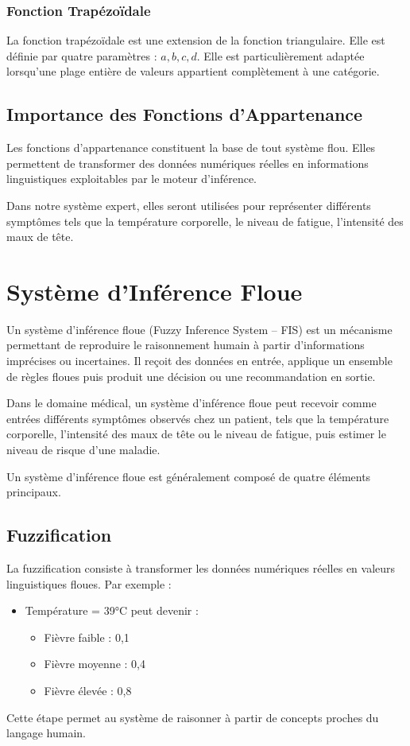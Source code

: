 \documentclass[a4paper,12pt]{report} %
\begin{document}
\subsubsection{Fonction Trapézoïdale}

La fonction trapézoïdale est une extension de la fonction triangulaire. Elle est définie par quatre paramètres : \( a, b, c, d \). Elle est particulièrement adaptée lorsqu'une plage entière de valeurs appartient complètement à une catégorie.

\subsection{Importance des Fonctions d'Appartenance}

Les fonctions d'appartenance constituent la base de tout système flou. Elles permettent de transformer des données numériques réelles en informations linguistiques exploitables par le moteur d'inférence.

Dans notre système expert, elles seront utilisées pour représenter différents symptômes tels que la température corporelle, le niveau de fatigue, l'intensité des maux de tête.

\section{Système d'Inférence Floue}

Un système d'inférence floue (Fuzzy Inference System – FIS) est un mécanisme permettant de reproduire le raisonnement humain à partir d'informations imprécises ou incertaines. Il reçoit des données en entrée, applique un ensemble de règles floues puis produit une décision ou une recommandation en sortie.

Dans le domaine médical, un système d'inférence floue peut recevoir comme entrées différents symptômes observés chez un patient, tels que la température corporelle, l'intensité des maux de tête ou le niveau de fatigue, puis estimer le niveau de risque d'une maladie.

Un système d'inférence floue est généralement composé de quatre éléments principaux.

\subsection{Fuzzification}

La fuzzification consiste à transformer les données numériques réelles en valeurs linguistiques floues. Par exemple :
\begin{itemize}
\item Température = 39°C peut devenir :
\begin{itemize}
\item Fièvre faible : 0,1
\item Fièvre moyenne : 0,4
\item Fièvre élevée : 0,8
\end{itemize}
\end{itemize}
Cette étape permet au système de raisonner à partir de concepts proches du langage humain.
\end{document}
